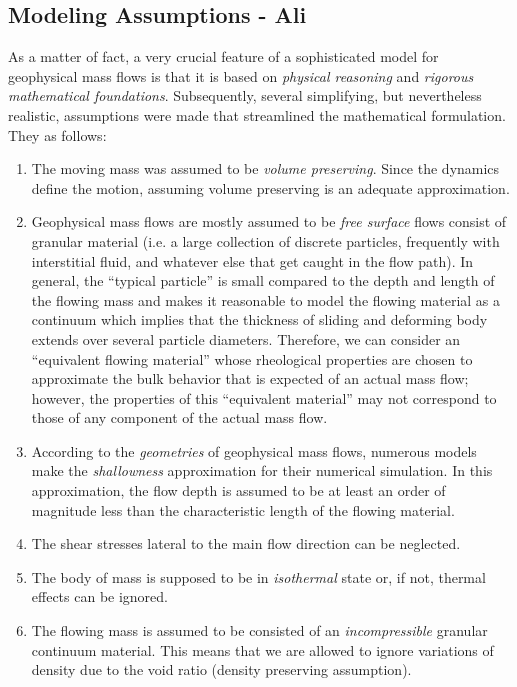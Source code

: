 \documentclass{article}
\begin{document}
\subsection{Modeling Assumptions - Ali}\label{subsec:ModelAssump}
As a matter of fact, a very crucial feature of a sophisticated model for geophysical mass flows is that it is based on \textit{physical reasoning} and \textit{rigorous mathematical foundations}. Subsequently, several simplifying, but nevertheless realistic, assumptions were made that streamlined the mathematical formulation. They as follows:
\begin{enumerate}
\item The moving mass was assumed to be \textit{volume preserving}. Since the dynamics define the motion, assuming volume preserving is an adequate approximation.
\item Geophysical mass flows are mostly assumed to be \textit{free surface} flows consist of granular material (i.e. a large collection of discrete particles, frequently with interstitial fluid, and whatever else that get caught in the flow path). In general, the ``typical particle'' is small compared to the depth and length of the flowing mass and makes it reasonable to model the flowing material as a continuum which implies that the thickness of sliding and deforming body extends over several particle diameters. Therefore, we can consider an ``equivalent flowing material'' whose rheological properties are chosen to approximate the bulk behavior that is expected of an actual mass flow; however, the properties of this ``equivalent material'' may not correspond to those of any component of the actual mass flow.
\item According to the \textit{geometries} of geophysical mass flows, numerous models make the \textit{shallowness} approximation for their numerical simulation. In this approximation, the flow depth is assumed to be at least an order of magnitude less than the characteristic length of the flowing material.
\item The shear stresses lateral to the main flow direction can be neglected.
\item The body of mass is supposed to be in \textit{isothermal} state or, if not, thermal effects can be ignored.
\item The flowing mass is assumed to be consisted of an \textit{incompressible} granular continuum material. This means that we are allowed to ignore variations of density due to the void ratio (density preserving assumption).

\end{enumerate}
\end{document}
